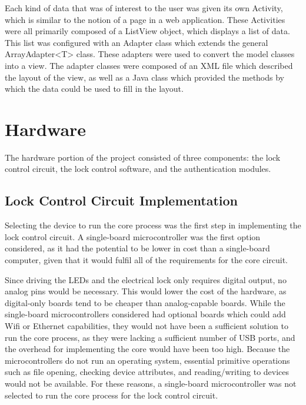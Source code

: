 \documentclass[12pt]{report}
\let\Oldsection\section
\renewcommand{\section}{\FloatBarrier\Oldsection}
\let\Oldsubsection\subsection
\renewcommand{\subsection}{\FloatBarrier\Oldsubsection}
\begin{document}
Each kind of data that was of interest to the user was given its own Activity, which is similar to the notion of a page
in a web application. These Activities were all primarily composed of a ListView object, which displays a list of data.
This list was configured with an Adapter class which extends the general ArrayAdapter<T> class. These adapters were
used to convert the model classes into a view. The adapter classes were composed of an XML file which described the
layout of the view, as well as a Java class which provided the methods by which the data could be used to fill in the
layout.


\section{Hardware} \label{hardware}

The hardware portion of the project consisted of three components: the lock control circuit, the lock control software, 
and the authentication modules.

\subsection{Lock Control Circuit Implementation} \label{section:lock-control-circuit-implementation}

Selecting the device to run the core process was the first step in implementing the lock control circuit. A 
single-board microcontroller was the first option considered, as it had the potential to be lower in cost than a 
single-board computer, given that it would fulfil all of the requirements for the core circuit.

Since driving the LEDs and the electrical lock only requires digital output, no analog pins would be necessary. This 
would lower the cost of the hardware, as digital-only boards tend to be cheaper than analog-capable boards. While 
the single-board microcontrollers considered had optional boards which could add Wifi or Ethernet capabilities, they 
would not have been a sufficient solution to run the core process, as they were lacking a sufficient number of USB 
ports, and the overhead for implementing the core would have been too high. Because the microcontrollers do not run an 
operating system, essential primitive operations such as file opening, checking device attributes, and reading/writing
to devices would not be available. For these reasons, a single-board microcontroller was not selected to run the core 
process for the lock control circuit.
\end{document}
